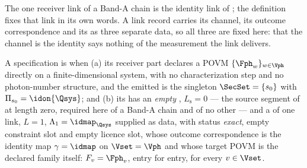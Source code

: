 
The one receiver link of a Band-A chain is the identity link of
; the definition fixes that link in its own
words. A link record carries its channel, its outcome correspondence and its
 as three separate data, so all three are
fixed here: that the channel is the identity says nothing of the measurement
the link delivers.

\begin{definition}\label{def:banda}
A specification is
when (a) its receiver part declares a POVM $\{\Fph_w\}_{w\in\Vph}$ directly on a
finite-dimensional system, with no characterization step and no photon-number
structure, and the emitted  is the singleton $\SecSet=\{s_0\}$ with
$\Pi_{s_0}=\idon{\Qsys}$; and (b) its  has an \emph{empty
}, $L_{\mathrm s}=0$ --- the source segment of
 at length zero, required here of a
Band-A chain and of no other --- and a  of one link, $L=1$,
$\Lambda_1=\idmap_{\Qsys}$ supplied as data, with status \emph{exact},
empty constraint slot and empty licence slot, whose outcome correspondence is
the identity map $\gamma=\idmap$ on $\Vset=\Vph$ and whose
target POVM is the declared family itself:
$F_v=\Fph_v$, entry for entry, for every $v\in\Vset$.
\end{definition}
